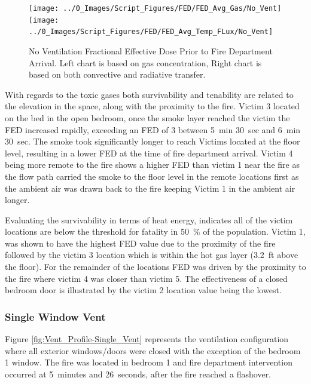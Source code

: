 \documentclass[12pt,oneside]{book}
\begin{document}
\begin{figure}[H]
	\centering
	\texttt{[image: ../0\_Images/Script\_Figures/FED/FED\_Avg\_Gas/No\_Vent]}
	\texttt{[image: ../0\_Images/Script\_Figures/FED/FED\_Avg\_Temp\_FLux/No\_Vent]}
	\caption[No Vent Fractional Effective Dose]{No Ventilation Fractional Effective Dose Prior to Fire Department Arrival. Left chart is based on gas concentration, Right chart is based on both convective and radiative transfer.}
	\label{fig:FED_NoVent}
\end{figure}

With regards to the toxic gases both survivability and tenability are related to the elevation in the space, along with the proximity to the fire. Victim 3 located on the bed in the open bedroom, once the smoke layer reached the victim the FED increased rapidly, exceeding an FED of 3 between 5~min 30~sec and 6~min 30~sec. The smoke took significantly longer to reach Victims located at the floor level, resulting in a lower FED at the time of fire department arrival. Victim 4 being more remote to the fire shows a higher FED than victim 1 near the fire as the flow path carried the smoke to the floor level in the remote locations first as the ambient air was drawn back to the fire keeping Victim 1 in the ambient air longer. 

Evaluating the survivability in terms of heat energy, indicates all of the victim locations are below the threshold for fatality in 50~\% of the population. Victim 1, was shown to have the highest FED value due to the proximity of the fire followed by the victim 3 location which is within the hot gas layer (3.2~ft above the floor). For the remainder of the locations FED was driven by the proximity to the fire where victim 4 was closer than victim 5. The effectiveness of a closed bedroom door is illustrated by the victim 2 location value being the lowest. 

\subsubsection{Single Window Vent}

Figure \ref{fig:Vent_Profile-Single_Vent} represents the ventilation configuration where all exterior windows/doors were closed with the exception of the bedroom 1 window. The fire was located in bedroom 1 and fire department intervention occurred at 5~minutes and 26~seconds, after the fire reached a flashover. 
\end{document}
